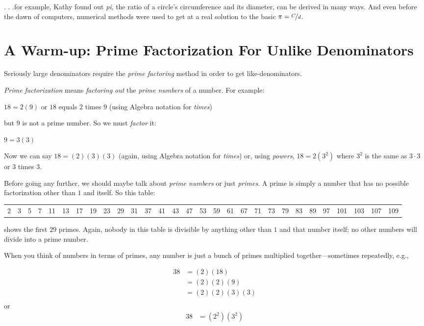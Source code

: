 \documentclass[koma]{article}
\begin{document}
. . .for example, Kathy found out \emph{pi}, the ratio of a circle's circumference and its diameter, can be derived in many ways. And even before the dawn of computers, numerical methods were used to get at a real solution to the basic \(\pi = \nicefrac{C}{d}\).


\section{A Warm-up: Prime Factorization For Unlike Denominators}
\label{sec:orgheadline8}

Seriously large denominators require the \emph{prime factoring} method
in order to get like-denominators.

\emph{Prime factorization} means \emph{factoring out} the \emph{prime numbers} of a number. For example:

\(18 = 2(9)\) or \(18\) equals \(2\) times \(9\) (using Algebra notation for \emph{times})

but \(9\) is not a prime number. So we must \emph{factor} it:

\(9 = 3(3)\)

Now we can say \(18 = (2)(3)(3)\) (again, using Algebra notation for \emph{times}) or, using \emph{powers}, \(18 = 2(3^2)\) where \(3^2\) is the same as \(3\cdot3\) or \(3\) times \(3\).

Before going any further, we should maybe talk about \emph{prime numbers} or just \emph{primes}. A prime is simply a number that has no possible factorization other than \(1\) and itself. So this table:

\begin{center}
\label{tab:orgtable1}

\begin{tabular}{rrrrrrrrrrrrrrrrrrrrrrrrrrrrr}
2 & 3 & 5 & 7 & 11 & 13 & 17 & 19 & 23 & 29 & 31 & 37 & 41 & 43 & 47 & 53 & 59 & 61 & 67 & 71 & 73 & 79 & 83 & 89 & 97 & 101 & 103 & 107 & 109\\
\end{tabular}
\end{center}

shows the first \(29\) primes. Again, nobody in this table is divisible by anything other than \(1\) and that number itself; no other numbers will divide into a prime number.

When you think of numbers in terms of primes, any number is just a bunch of primes multiplied together---sometimes repeatedly, e.g.,

\begin{align*}
38 & = (2)(18)\\
   & = (2)(2)(9)\\
   & = (2)(2)(3)(3)\\
\end{align*}
or
\begin{align*}
38 & = (2^2)(3^2)
\end{align*}
\end{document}
